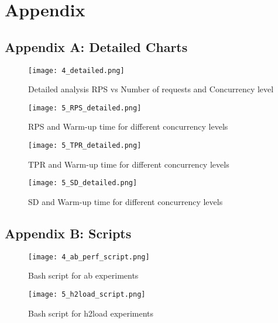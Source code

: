 \section{Appendix}

\subsection*{Appendix A: Detailed Charts}\label{sec:detailed_charts}

\begin{figure}[H]
    \centering
    \texttt{[image: 4\_detailed.png]}
    \caption{\small Detailed analysis RPS vs Number of requests and Concurrency level}
    \label{fig:4_detailed}
\end{figure}

\begin{figure}[H]
    \centering
    \texttt{[image: 5\_RPS\_detailed.png]}
    \caption{\small RPS and Warm-up time for different concurrency levels}
    \label{fig:5_RPS_detailed}
\end{figure}

\begin{figure}[H]
    \centering
    \texttt{[image: 5\_TPR\_detailed.png]}
    \caption{\small TPR and Warm-up time for different concurrency levels}
    \label{fig:5_TPR_detailed}
\end{figure}

\begin{figure}[H]
    \centering
    \texttt{[image: 5\_SD\_detailed.png]}
    \caption{\small SD and Warm-up time for different concurrency levels}
    \label{fig:5_SD_detailed}
\end{figure}


\subsection*{Appendix B: Scripts}\label{sec:scripts}

\begin{figure}[H]
    \centering
    \texttt{[image: 4\_ab\_perf\_script.png]}
    \caption{\small Bash script for ab experiments}
    \label{fig:4_ab_perf_script}
\end{figure}

\begin{figure}[H]
    \centering
    \texttt{[image: 5\_h2load\_script.png]}
    \caption{\small Bash script for h2load experiments}
    \label{fig:5_h2load_script}
\end{figure}
